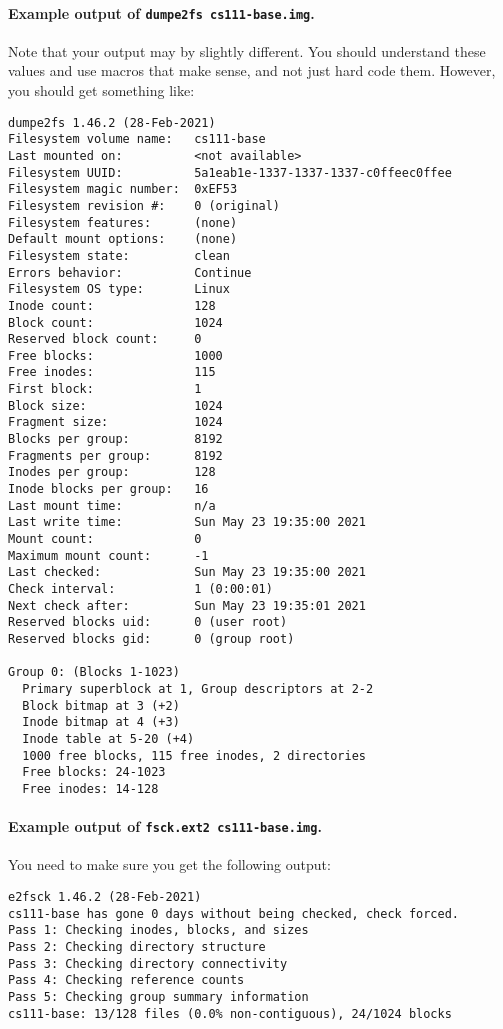 \newpage

\paragraph{Example output of \lstinline|dumpe2fs cs111-base.img|.}

Note that your output may by slightly different. You should understand these
values and use macros that make sense, and not just hard code them.
However, you should get something like:

\begin{lstlisting}
dumpe2fs 1.46.2 (28-Feb-2021)
Filesystem volume name:   cs111-base
Last mounted on:          <not available>
Filesystem UUID:          5a1eab1e-1337-1337-1337-c0ffeec0ffee
Filesystem magic number:  0xEF53
Filesystem revision #:    0 (original)
Filesystem features:      (none)
Default mount options:    (none)
Filesystem state:         clean
Errors behavior:          Continue
Filesystem OS type:       Linux
Inode count:              128
Block count:              1024
Reserved block count:     0
Free blocks:              1000
Free inodes:              115
First block:              1
Block size:               1024
Fragment size:            1024
Blocks per group:         8192
Fragments per group:      8192
Inodes per group:         128
Inode blocks per group:   16
Last mount time:          n/a
Last write time:          Sun May 23 19:35:00 2021
Mount count:              0
Maximum mount count:      -1
Last checked:             Sun May 23 19:35:00 2021
Check interval:           1 (0:00:01)
Next check after:         Sun May 23 19:35:01 2021
Reserved blocks uid:      0 (user root)
Reserved blocks gid:      0 (group root)

Group 0: (Blocks 1-1023)
  Primary superblock at 1, Group descriptors at 2-2
  Block bitmap at 3 (+2)
  Inode bitmap at 4 (+3)
  Inode table at 5-20 (+4)
  1000 free blocks, 115 free inodes, 2 directories
  Free blocks: 24-1023
  Free inodes: 14-128
\end{lstlisting}

\paragraph{Example output of \lstinline|fsck.ext2 cs111-base.img|.}

You need to make sure you get the following output:

\begin{lstlisting}
e2fsck 1.46.2 (28-Feb-2021)
cs111-base has gone 0 days without being checked, check forced.
Pass 1: Checking inodes, blocks, and sizes
Pass 2: Checking directory structure
Pass 3: Checking directory connectivity
Pass 4: Checking reference counts
Pass 5: Checking group summary information
cs111-base: 13/128 files (0.0% non-contiguous), 24/1024 blocks
\end{lstlisting}



